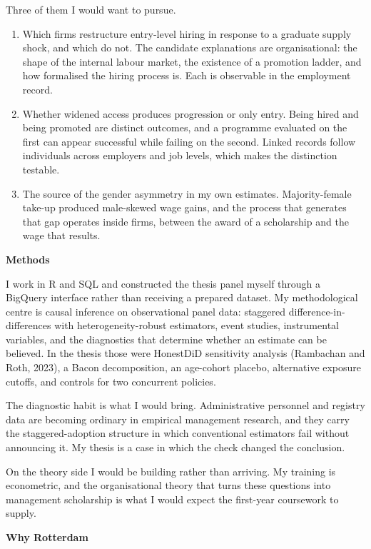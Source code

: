 \documentclass[a4paper,11pt]{article}
\newcommand{\sectionrule}[1]{\vspace{1.5mm}\noindent\textbf{#1}\par\vspace{-0.4em}}
\begin{document}
Three of them I would want to pursue.

\begin{enumerate}[leftmargin=*, itemsep=3pt, topsep=4pt]
\item Which firms restructure entry-level hiring in response to a graduate supply shock, and which do not. The candidate explanations are organisational: the shape of the internal labour market, the existence of a promotion ladder, and how formalised the hiring process is. Each is observable in the employment record.
\item Whether widened access produces progression or only entry. Being hired and being promoted are distinct outcomes, and a programme evaluated on the first can appear successful while failing on the second. Linked records follow individuals across employers and job levels, which makes the distinction testable.
\item The source of the gender asymmetry in my own estimates. Majority-female take-up produced male-skewed wage gains, and the process that generates that gap operates inside firms, between the award of a scholarship and the wage that results.
\end{enumerate}

\sectionrule{Methods}

I work in R and SQL and constructed the thesis panel myself through a BigQuery interface rather than receiving a prepared dataset. My methodological centre is causal inference on observational panel data: staggered difference-in-differences with heterogeneity-robust estimators, event studies, instrumental variables, and the diagnostics that determine whether an estimate can be believed. In the thesis those were HonestDiD sensitivity analysis (Rambachan and Roth, 2023), a Bacon decomposition, an age-cohort placebo, alternative exposure cutoffs, and controls for two concurrent policies.

The diagnostic habit is what I would bring. Administrative personnel and registry data are becoming ordinary in empirical management research, and they carry the staggered-adoption structure in which conventional estimators fail without announcing it. My thesis is a case in which the check changed the conclusion.

On the theory side I would be building rather than arriving. My training is econometric, and the organisational theory that turns these questions into management scholarship is what I would expect the first-year coursework to supply.

\sectionrule{Why Rotterdam}
\end{document}
